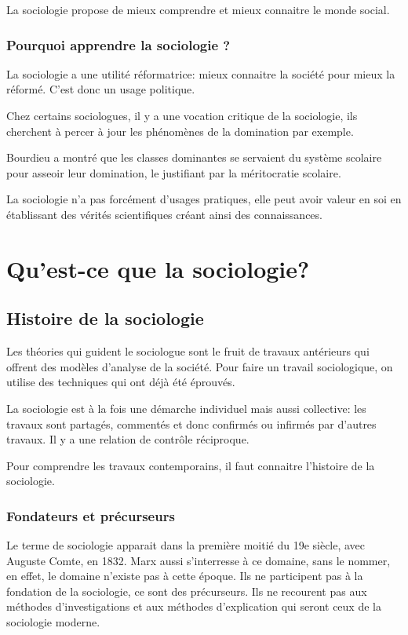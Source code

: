 \documentclass[10pt, a4paper, openany]{book}
\begin{document}
La sociologie propose de mieux comprendre et mieux connaitre le monde social.

	\section{Pourquoi apprendre la sociologie ?}

La sociologie a une utilité réformatrice: mieux connaitre la société pour mieux la réformé. C'est donc un usage politique. 

Chez certains sociologues, il y a une vocation critique de la sociologie, ils cherchent à percer à jour les phénomènes de la domination par exemple.

Bourdieu a montré que les classes dominantes se servaient du système scolaire pour asseoir leur domination, le justifiant par la méritocratie scolaire.

La sociologie n'a pas forcément d'usages pratiques, elle peut avoir valeur en soi en établissant des vérités scientifiques créant ainsi des connaissances.

\part{Qu'est-ce que la sociologie?}
\chapter{Histoire de la sociologie}

Les théories qui guident le sociologue sont le fruit de travaux antérieurs qui offrent des modèles d'analyse de la société. Pour faire un travail sociologique, on utilise des techniques qui ont déjà été éprouvés.

La sociologie est à la fois une démarche individuel mais aussi collective: les travaux sont partagés, commentés et donc confirmés ou infirmés par d'autres travaux. Il y a une relation de contrôle réciproque.

Pour comprendre les travaux contemporains, il faut connaitre l'histoire de la sociologie.

\section{Fondateurs et précurseurs}

Le terme de sociologie apparait dans la première moitié du 19e siècle, avec Auguste Comte, en 1832. Marx aussi s'interresse à ce domaine, sans le nommer, en effet, le domaine n'existe pas à cette époque. Ils ne participent pas à la fondation de la sociologie, ce sont des précurseurs. Ils ne recourent pas aux méthodes d'investigations et aux méthodes d'explication qui seront ceux de la sociologie moderne.
\end{document}
